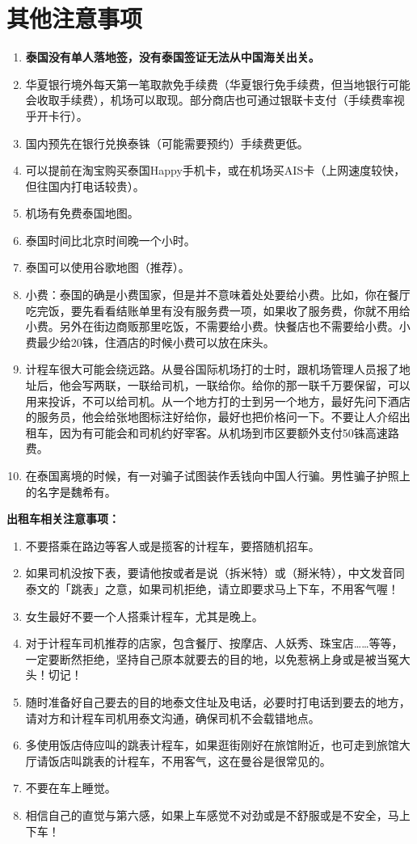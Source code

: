 \documentclass[utf-8,10pt]{ctexart}
\begin{document}
\section{其他注意事项}
\begin{enumerate}
\item \textbf{泰国没有单人落地签，没有泰国签证无法从中国海关出关。}
\item 华夏银行境外每天第一笔取款免手续费（华夏银行免手续费，但当地银行可能会收取手续费），机场可以取现。部分商店也可通过银联卡支付（手续费率视乎开卡行）。
\item 国内预先在银行兑换泰铢（可能需要预约）手续费更低。
\item 可以提前在淘宝购买泰国Happy手机卡，或在机场买AIS卡（上网速度较快，但往国内打电话较贵）。
\item 机场有免费泰国地图。
\item 泰国时间比北京时间晚一个小时。
\item 泰国可以使用谷歌地图（推荐）。
\item 小费：泰国的确是小费国家，但是并不意味着处处要给小费。比如，你在餐厅吃完饭，要先看看结账单里有没有服务费一项，如果收了服务费，你就不用给小费。另外在街边商贩那里吃饭，不需要给小费。快餐店也不需要给小费。小费最少给20铢，住酒店的时候小费可以放在床头。
\item 计程车很大可能会绕远路。从曼谷国际机场打的士时，跟机场管理人员报了地址后，他会写两联，一联给司机，一联给你。给你的那一联千万要保留，可以用来投诉，不可以给司机。从一个地方打的士到另一个地方，最好先问下酒店的服务员，他会给张地图标注好给你，最好也把价格问一下。不要让人介绍出租车，因为有可能会和司机约好宰客。从机场到市区要额外支付50铢高速路费。
\item 在泰国离境的时候，有一对骗子试图装作丢钱向中国人行骗。男性骗子护照上的名字是魏希有。
\end{enumerate}

\textbf{出租车相关注意事项：}
\begin{enumerate}
\item 不要搭乘在路边等客人或是揽客的计程车，要撘随机招车。
\item 如果司机没按下表，要请他按或者是说（拆米特）或（掰米特），中文发音同泰文的「跳表」之意，如果司机拒绝，请立即要求马上下车，不用客气喔！
\item 女生最好不要一个人搭乘计程车，尤其是晚上。
\item 对于计程车司机推荐的店家，包含餐厅、按摩店、人妖秀、珠宝店……等等，一定要断然拒绝，坚持自己原本就要去的目的地，以免惹祸上身或是被当冤大头！切记！
\item 随时准备好自己要去的目的地泰文住址及电话，必要时打电话到要去的地方，请对方和计程车司机用泰文沟通，确保司机不会载错地点。
\item 多使用饭店侍应叫的跳表计程车，如果逛街刚好在旅馆附近，也可走到旅馆大厅请饭店叫跳表的计程车，不用客气，这在曼谷是很常见的。
\item 不要在车上睡觉。
\item 相信自己的直觉与第六感，如果上车感觉不对劲或是不舒服或是不安全，马上下车！
\end{enumerate}
\end{document}
